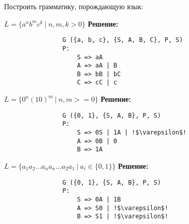 \documentclass[]{article}
\begin{document}
\begin{enumerate}
\begin{item}
\begin{enumerate}
    \end{enumerate}
\end{item}

\begin{item}
    Построить грамматику, порождающую язык:
    \begin{enumerate}
    
        \begin{item}
            $L = \{ a^n b^m c^k\ |\  n, m, k > 0 \}$
            \bigbreak
            \textbf{Решение:}
            \begin{lstlisting}
                G ({a, b, c}, {S, A, B, C}, P, S)
                P:
                    S => aA
                    A => aA | B
                    B => bB | bC
                    C => cC | c
            \end{lstlisting}
        \end{item}

        \begin{item}
            $L = \{ 0^n (10)^m \ |\  n, m >= 0 \}$
            \bigbreak
            \textbf{Решение:}
            \begin{lstlisting}
                G ({0, 1}, {S, A, B}, P, S)
                P:
                    S => 0S | 1A | !$\varepsilon$!
                    A => 0B | 0
                    B => 1A
            \end{lstlisting}
        \end{item}

        \begin{item}
            $L = \{ a_1 a_2 \dots a_n a_n \dots a_2 a_1 \ |\  a_i \in \{ 0, 1 \} \}$
            \bigbreak
            \textbf{Решение:}
            \begin{lstlisting}
                G ({0, 1}, {S, A, B}, P, S)
                P:
                    S => 0A | 1B
                    A => S0 | !$\varepsilon$!
                    B => S1 | !$\varepsilon$!
            \end{lstlisting}
        \end{item}
    
    \end{enumerate}
\end{item}

\end{enumerate}

\end{document}
